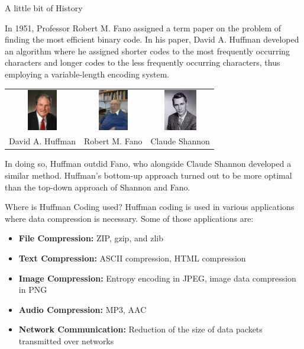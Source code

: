\documentclass{beamer}
\begin{document}
	\begin{frame}{A little bit of History}
		
		{\small
			In 1951, Professor Robert M. Fano assigned a term paper on the problem of finding the most efficient binary code. In his paper, David A. Huffman developed an algorithm where he assigned shorter codes to the most frequently occurring characters and longer codes to the less frequently occurring characters, thus employing a variable-length encoding system.
		}
		
		\begin{center}
			\begin{tabular}{c c c}
				\includegraphics[height = 0.7in, width = 0.65in]{images/huffman.jpg} & 
				\includegraphics[height = 0.7in, width = 0.65in]{images/fano.jpg} & 
				\includegraphics[height = 0.7in, width = 0.65in]{images/shannon.jpg} \\
				\scriptsize{David A. Huffman} & \scriptsize{Robert M. Fano} & \scriptsize{Claude Shannon} \\
			\end{tabular}    
		\end{center}
		
		{\small
			In doing so, Huffman outdid Fano, who alongside Claude Shannon developed a similar method. Huffman's bottom-up approach turned out to be more optimal than the top-down approach of Shannon and Fano.}
	\end{frame}
	
	\begin{frame}{Where is Huffman Coding used?}
		Huffman coding is used in various applications where data compression is necessary. Some of those applications are: 
		
		\begin{itemize}
			\item<1-> \textbf{File Compression:} ZIP, gzip, and zlib
			\item<2-> \textbf{Text Compression:} ASCII compression, HTML compression
			\item<3-> \textbf{Image Compression:} Entropy encoding in JPEG, image data compression in PNG
			\item<4-> \textbf{Audio Compression:} MP3, AAC
			\item<5-> \textbf{Network Communication:} Reduction of the size of data packets transmitted over networks
		\end{itemize}
	\end{frame}
	
\end{document}
